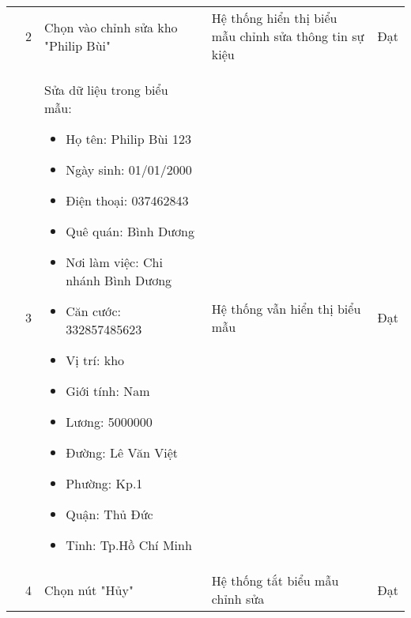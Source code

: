 {\begin{longtable}{| p{2.5cm}| p{1cm}| p{5.5cm}| p{4.5cm} | p{1.5cm} |}
        \cline{2-5}
         & 2 & Chọn vào chỉnh sửa kho "Philip Bùi" & Hệ thống hiển thị biểu mẫu chỉnh sửa thông tin sự kiệu & Đạt \\
        \cline{2-5}
        & 3 & Sửa dữ liệu trong biểu mẫu:
        \begin{itemize}
            \item Họ tên: Philip Bùi 123
            \item Ngày sinh: 01/01/2000
            \item Điện thoại: 037462843
            \item Quê quán: Bình Dương
            \item Nơi làm việc: Chi nhánh Bình Dương
            \item Căn cước: 332857485623
            \item Vị trí: kho
            \item Giới tính: Nam
            \item Lương: 5000000
            \item Đường: Lê Văn Việt
            \item Phường: Kp.1
            \item Quận: Thủ Đức 
            \item Tỉnh: Tp.Hồ Chí Minh
        \end{itemize} & Hệ thống vẫn hiển thị biểu mẫu & Đạt \\
        \cline{2-5}
         & 4 & Chọn nút "Hủy" & Hệ thống tắt biểu mẫu chỉnh sửa & Đạt \\
        \hline
    \end{longtable} 
}
